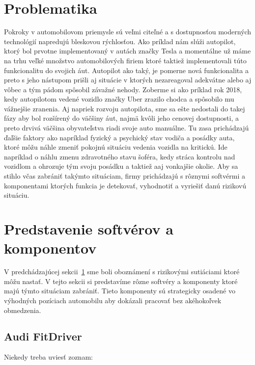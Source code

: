 \documentclass[10pt,twoside,slovak,a4paper]{article}
\begin{document}
\section{Problematika} \label{problematika}

Pokroky v automobilovom priemysle sú veľmi citeľné a s dostupnosťou moderných technológií napredujú bleskovou rýchlosťou. Ako príklad nám slúži autopilot, ktorý bol prvotne implementovaný v autách značky Tesla a momentálne už máme na trhu veľké množstvo automobilových firiem ktoré taktiež implementovali túto funkcionalitu do svojich áut. Autopilot ako taký, je pomerne nová funkcionalita a preto s jeho nástupom prišli aj situácie v ktorých nezareagoval adekvátne alebo aj vôbec a tým pádom spôsobil závažné nehody. Zoberme si ako príklad rok 2018\cite{main}, kedy autopilotom vedené vozidlo značky Uber zrazilo chodca a spôsobilo mu vážnejšie zranenia. Aj napriek rozvoju autopilota, sme sa ešte nedostali do takej fázy aby bol rozšírený do väčšiny áut, najmä kvôli jeho cenovej dostupnosti, a preto drvivá väčšina obyvateľstva riadi svoje auto manuálne. Tu zasa prichádzajú ďaľšie faktory ako napríklad fyzický a psychický stav vodiča a posádky auta, ktoré môžu náhle zmeniť pokojnú situáciu vedenia vozidla na kritickú. Ide napríklad o náhlu zmenu zdravotného stavu šoféra, kedy stráca kontrolu nad vozidlom a ohrozuje tým svoju posádku a taktiež aaj vonkajšie okolie. Aby sa stihlo včas zabrániť takýmto situáciam, firmy prichádzajú s rôznymi softvérmi a komponentami ktorých funkcia je detekovať, vyhodnotiť a vyriešiť danú rizikovú situáciu.



\section{Predstavenie softvérov a komponentov} \label{predstavenie}

V predchádzajúcej sekcii~\ref{problematika} sme boli oboznámení s rizikovými sutiáciami ktoré môžu nastať. V tejto sekcii si predstavíme rôzne softvéry a komponenty ktoré majú týmto situáciam zabrániť. Tieto komponenty sú strategicky osadené vo výhodných pozíciach automobilu aby dokázali pracovať bez akéhokoľvek obmedzenia.

\subsection{Audi FitDriver} \label{predstavenie:audi}

Niekedy treba uviesť zoznam:
\end{document}
